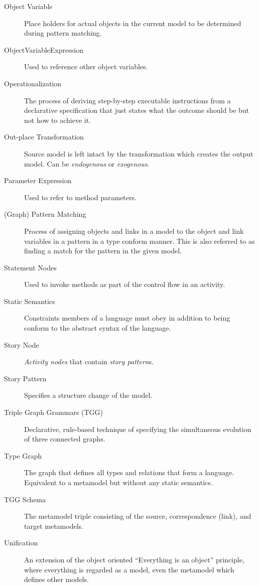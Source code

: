 \begin{description}
\item[Object Variable] %
Place holders for actual objects in the current model to be determined during pattern matching.

\item[ObjectVariableExpression] %
Used to reference other object variables.

\item[Operationalization] %
The process of deriving step-by-step executable instructions from a declarative specification that just states what the outcome should
be but not how to achieve it.

\item[Out-place Transformation] %
Source model is left intact by the transformation which creates the output model. Can be \emph{endogenous} or \emph{exogenous}.

\item[Parameter Expression]  %
Used to refer to method parameters.

\item[(Graph) Pattern Matching] %
Process of assigning objects and links in a model to the object and link variables in a pattern in a type conform manner. This is also referred to as finding a
match for the pattern in the given model.

\item[Statement Nodes] %
Used to invoke methods as part of the control flow in an activity.

\item[Static Semantics] %
Constraints members of a language must obey in addition to being conform to the abstract syntax of the language.

\item[Story Node] %
\emph{Activity nodes} that contain \emph{story pattern}s.

\item[Story Pattern] %
Specifies a structure change of the model.

\item[Triple Graph Grammars (TGG)] %
Declarative, rule-based technique of specifying the simultaneous evolution of three connected graphs.

\item[Type Graph] %
The graph that defines all types and relations that form a language. Equivalent to a metamodel but without any static semantics.

\item[TGG Schema] %
The metamodel triple consisting of the source, correspondence (link), and target metamodels.

\item[Unification]  %
An extension of the object oriented ``Everything is an object'' principle, where everything is regarded as a model, even the metamodel which defines other
models.

\end{description}
